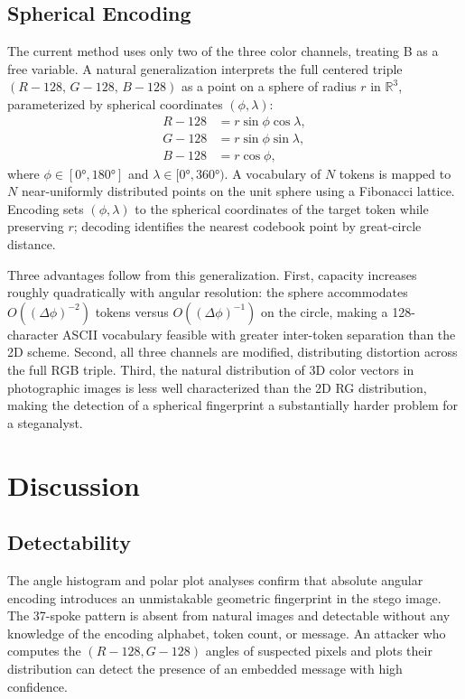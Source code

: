 \documentclass[12pt]{article}
\begin{document}
\subsection{Spherical Encoding}

The current method uses only two of the three color channels, treating B as
a free variable. A natural generalization interprets the full centered triple
$(R{-}128,\,G{-}128,\,B{-}128)$ as a point on a sphere of radius $r$ in
$\mathbb{R}^3$, parameterized by spherical coordinates $(\phi, \lambda)$:
\begin{align*}
    R - 128 &= r\sin\phi\cos\lambda, \\
    G - 128 &= r\sin\phi\sin\lambda, \\
    B - 128 &= r\cos\phi,
\end{align*}
where $\phi \in [0°, 180°]$ and $\lambda \in [0°, 360°)$. A vocabulary of
$N$ tokens is mapped to $N$ near-uniformly distributed points on the unit
sphere using a Fibonacci lattice. Encoding sets $(\phi, \lambda)$ to the
spherical coordinates of the target token while preserving $r$; decoding
identifies the nearest codebook point by great-circle distance.

Three advantages follow from this generalization. First, capacity increases
roughly quadratically with angular resolution: the sphere accommodates
$O((\Delta\phi)^{-2})$ tokens versus $O((\Delta\phi)^{-1})$ on the circle,
making a 128-character ASCII vocabulary feasible with greater inter-token
separation than the 2D scheme. Second, all three channels are modified,
distributing distortion across the full RGB triple. Third, the natural
distribution of 3D color vectors in photographic images is less well
characterized than the 2D RG distribution, making the detection of a
spherical fingerprint a substantially harder problem for a steganalyst.

\section{Discussion}
\label{sec:discussion}

\subsection{Detectability}

The angle histogram and polar plot analyses confirm that absolute angular
encoding introduces an unmistakable geometric fingerprint in the stego
image. The 37-spoke pattern is absent from natural images and detectable
without any knowledge of the encoding alphabet, token count, or message.
An attacker who computes the $(R{-}128, G{-}128)$ angles of suspected pixels
and plots their distribution can detect the presence of an embedded message
with high confidence.
\end{document}
